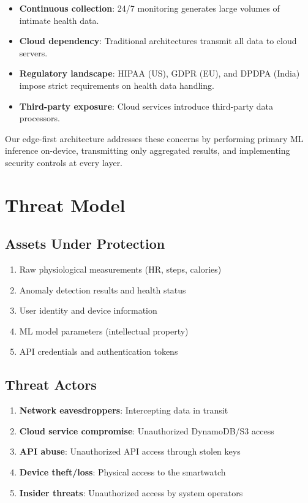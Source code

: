 \documentclass[conference]{IEEEtran}
\begin{document}
\begin{itemize}
    \item \textbf{Continuous collection}: 24/7 monitoring generates large volumes of intimate health data.
    \item \textbf{Cloud dependency}: Traditional architectures transmit all data to cloud servers.
    \item \textbf{Regulatory landscape}: HIPAA (US), GDPR (EU), and DPDPA (India) impose strict requirements on health data handling.
    \item \textbf{Third-party exposure}: Cloud services introduce third-party data processors.
\end{itemize}

Our edge-first architecture addresses these concerns by performing primary ML inference on-device, transmitting only aggregated results, and implementing security controls at every layer.

\section{Threat Model}

\subsection{Assets Under Protection}
\begin{enumerate}
    \item Raw physiological measurements (HR, steps, calories)
    \item Anomaly detection results and health status
    \item User identity and device information
    \item ML model parameters (intellectual property)
    \item API credentials and authentication tokens
\end{enumerate}

\subsection{Threat Actors}
\begin{enumerate}
    \item \textbf{Network eavesdroppers}: Intercepting data in transit
    \item \textbf{Cloud service compromise}: Unauthorized DynamoDB/S3 access
    \item \textbf{API abuse}: Unauthorized API access through stolen keys
    \item \textbf{Device theft/loss}: Physical access to the smartwatch
    \item \textbf{Insider threats}: Unauthorized access by system operators
\end{enumerate}
\end{document}
